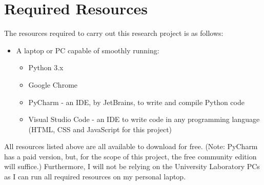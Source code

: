 %
%

\section*{Required Resources}
The resources required to carry out this research project is as follows:

\begin{itemize}
	\item A laptop or PC capable of smoothly running:
	\begin{itemize}
		\item Python 3.x 
		\item Google Chrome
		\item PyCharm - an IDE, by JetBrains, to write and compile Python code
		\item Visual Studio Code - an IDE to write code in any programming language (HTML, CSS and JavaScript for this project)
	\end{itemize}
\end{itemize}
All resources listed above are all available to download for free. (Note: PyCharm has a paid version, but, for the scope of this project, the free community edition will suffice.) Furthermore, I will not be relying on the University Laboratory PCs as I can run all required resources on my personal laptop. 